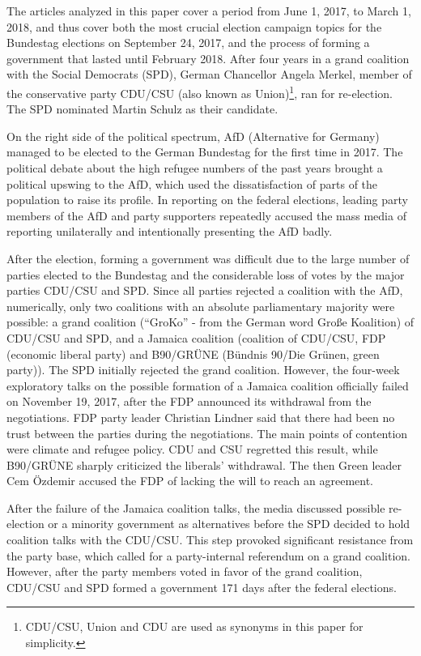 \documentclass[
]{article}
\begin{document}
The articles analyzed in this paper cover a period from June 1, 2017, to
March 1, 2018, and thus cover both the most crucial election campaign
topics for the Bundestag elections on September 24, 2017, and the
process of forming a government that lasted until February 2018. After
four years in a grand coalition with the Social Democrats (SPD), German
Chancellor Angela Merkel, member of the conservative party CDU/CSU (also
known as Union)\footnote{CDU/CSU, Union and CDU are used as synonyms in
  this paper for simplicity.}, ran for re-election. The SPD nominated
Martin Schulz as their candidate.

On the right side of the political spectrum, AfD (Alternative for
Germany) managed to be elected to the German Bundestag for the first
time in 2017. The political debate about the high refugee numbers of the
past years brought a political upswing to the AfD, which used the
dissatisfaction of parts of the population to raise its profile. In
reporting on the federal elections, leading party members of the AfD and
party supporters repeatedly accused the mass media of reporting
unilaterally and intentionally presenting the AfD badly.

After the election, forming a government was difficult due to the large
number of parties elected to the Bundestag and the considerable loss of
votes by the major parties CDU/CSU and SPD. Since all parties rejected a
coalition with the AfD, numerically, only two coalitions with an
absolute parliamentary majority were possible: a grand coalition
(``GroKo'' - from the German word Große Koalition) of CDU/CSU and SPD,
and a Jamaica coalition (coalition of CDU/CSU, FDP (economic liberal
party) and B90/GRÜNE (Bündnis 90/Die Grünen, green party)). The SPD
initially rejected the grand coalition. However, the four-week
exploratory talks on the possible formation of a Jamaica coalition
officially failed on November 19, 2017, after the FDP announced its
withdrawal from the negotiations. FDP party leader Christian Lindner
said that there had been no trust between the parties during the
negotiations. The main points of contention were climate and refugee
policy. CDU and CSU regretted this result, while B90/GRÜNE sharply
criticized the liberals' withdrawal. The then Green leader Cem Özdemir
accused the FDP of lacking the will to reach an agreement.

After the failure of the Jamaica coalition talks, the media discussed
possible re-election or a minority government as alternatives before the
SPD decided to hold coalition talks with the CDU/CSU. This step provoked
significant resistance from the party base, which called for a
party-internal referendum on a grand coalition. However, after the party
members voted in favor of the grand coalition, CDU/CSU and SPD formed a
government 171 days after the federal elections.
\end{document}

